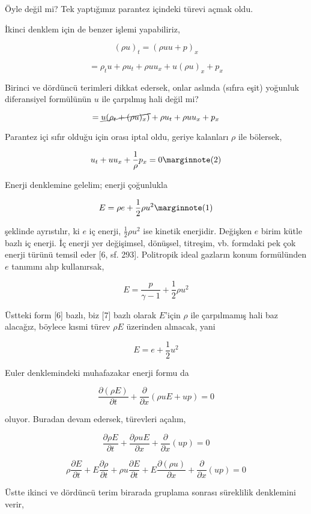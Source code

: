 \documentclass[12pt,fleqn]{article}\usepackage{../../common}
\begin{document}
Öyle değil mi? Tek yaptığımız parantez içindeki türevi açmak oldu. 

İkinci denklem için de benzer işlemi yapabiliriz,

$$
(\rho u)_t = (\rho uu + p)_x
$$

$$
= \rho_t u + \rho u_t + \rho u u_x + u (\rho u)_x + p_x
$$

Birinci ve dördüncü terimleri dikkat edersek, onlar aslında (sıfıra eşit)
yoğunluk diferansiyel formülünün $u$ ile çarpılmış hali değil mi?

$$
= \cancel{u (\rho_t + (\rho u)_x )} + \rho u_t + \rho u u_x + p_x
$$

Parantez içi sıfır olduğu için orası iptal oldu, geriye kalanları $\rho$
ile bölersek,

$$
u_t + u u_x + \frac{1}{\rho} p_x = 0
\mlabel{2}
$$

Enerji
denklemine gelelim; enerji çoğunlukla

$$
E = \rho e + \frac{1}{2} \rho u^2
\mlabel{1}
$$

şeklinde ayrıstılır, ki $e$ iç enerji, $\frac{1}{2}\rho u^2$ ise kinetik
enerjidir. Değişken $e$ birim kütle bazlı iç enerji. İç enerji yer değişimsel,
dönüşsel, titreşim, vb. formdaki pek çok enerji türünü temsil eder [6, sf. 293].
Politropik ideal gazların konum formülünden $e$ tanımını alıp kullanırsak,

$$
E = \frac{p}{\gamma - 1} + \frac{1}{2} \rho u^2
$$

Üstteki form [6] bazlı, biz [7] bazlı olarak $E$'için $\rho$ ile çarpılmamış
hali baz alacağız, böylece kısmi türev $\rho E$ üzerinden alınacak, yani

$$
E = e + \frac{1}{2} u^2
$$

Euler denklemindeki muhafazakar enerji formu da

$$
\frac{\partial (\rho E)}{\partial t} + \frac{\partial }{\partial x} (\rho u E + up) = 0
$$

oluyor. Buradan devam edersek, türevleri açalım,

$$
\frac{\partial \rho E}{\partial t} + \frac{\partial \rho u E}{\partial x} +
\frac{\partial }{\partial x} (up) = 0
$$

$$
\rho \frac{\partial E}{\partial t} + E \frac{\partial \rho}{\partial t} +
\rho u \frac{\partial E}{\partial t} + E \frac{\partial (\rho u)}{\partial x} +
\frac{\partial }{\partial x} (up) = 0
$$

Üstte ikinci ve dördüncü terim birarada gruplama sonrası süreklilik denklemini
verir,
\end{document}
